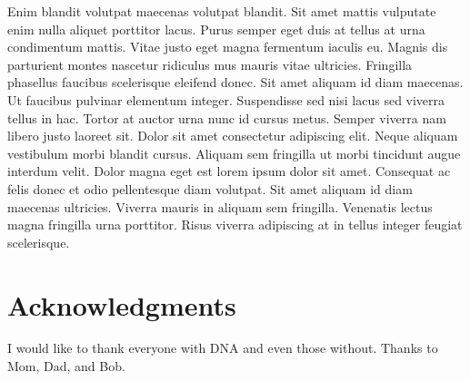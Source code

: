 

\cleardoublepage
\setcounter{savepage}{\thepage}
\begin{abstractpage}
Enim blandit volutpat maecenas volutpat blandit. Sit amet mattis vulputate enim nulla aliquet porttitor lacus. Purus semper eget duis at tellus at urna condimentum mattis. Vitae justo eget magna fermentum iaculis eu. Magnis dis parturient montes nascetur ridiculus mus mauris vitae ultricies. Fringilla phasellus faucibus scelerisque eleifend donec. Sit amet aliquam id diam maecenas. Ut faucibus pulvinar elementum integer. Suspendisse sed nisi lacus sed viverra tellus in hac. Tortor at auctor urna nunc id cursus metus. Semper viverra nam libero justo laoreet sit. Dolor sit amet consectetur adipiscing elit. Neque aliquam vestibulum morbi blandit cursus. Aliquam sem fringilla ut morbi tincidunt augue interdum velit. Dolor magna eget est lorem ipsum dolor sit amet. Consequat ac felis donec et odio pellentesque diam volutpat. Sit amet aliquam id diam maecenas ultricies. Viverra mauris in aliquam sem fringilla. Venenatis lectus magna fringilla urna porttitor. Risus viverra adipiscing at in tellus integer feugiat scelerisque.
\end{abstractpage}


\readerpage

\cleardoublepage

% 

\cleardoublepage

\section*{Acknowledgments}

I would like to thank everyone with DNA and even those without. Thanks to Mom, Dad, and Bob.
